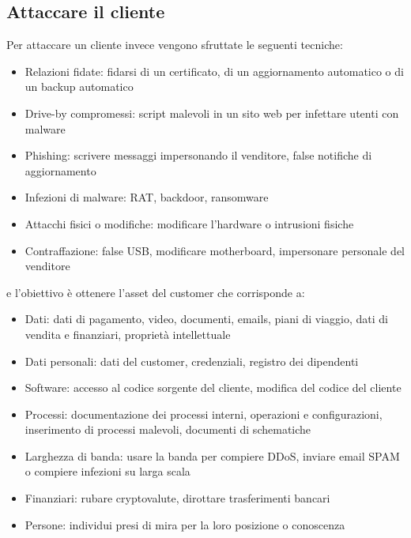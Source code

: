 \subsection{Attaccare il cliente}
Per attaccare un cliente invece vengono sfruttate le seguenti tecniche:
\begin{itemize}[noitemsep]
    \item Relazioni fidate: fidarsi di un certificato, di un aggiornamento automatico o di un backup automatico
    \item Drive-by compromessi: script malevoli in un sito web per infettare utenti con malware
    \item Phishing: scrivere messaggi impersonando il venditore, false notifiche di aggiornamento
    \item Infezioni di malware: \acrfull{RAT}, backdoor, ransomware
    \item Attacchi fisici o modifiche: modificare l'hardware o intrusioni fisiche
    \item Contraffazione: false USB, modificare motherboard, impersonare personale del venditore
\end{itemize}
e l'obiettivo è ottenere l'asset del customer che corrisponde a:
\begin{itemize}[noitemsep]
    \item Dati: dati di pagamento, video, documenti, emails, piani di viaggio, dati di vendita e finanziari, proprietà intellettuale
    \item Dati personali: dati del customer, credenziali, registro dei dipendenti
    \item Software: accesso al codice sorgente del cliente, modifica del codice del cliente
    \item Processi: documentazione dei processi interni, operazioni e configurazioni, inserimento di processi malevoli, documenti di schematiche
    \item Larghezza di banda: usare la banda per compiere \acrshort{DDoS}, inviare email SPAM o compiere infezioni su larga scala
    \item Finanziari: rubare cryptovalute, dirottare trasferimenti bancari
    \item Persone: individui presi di mira per la loro posizione o conoscenza
\end{itemize}

